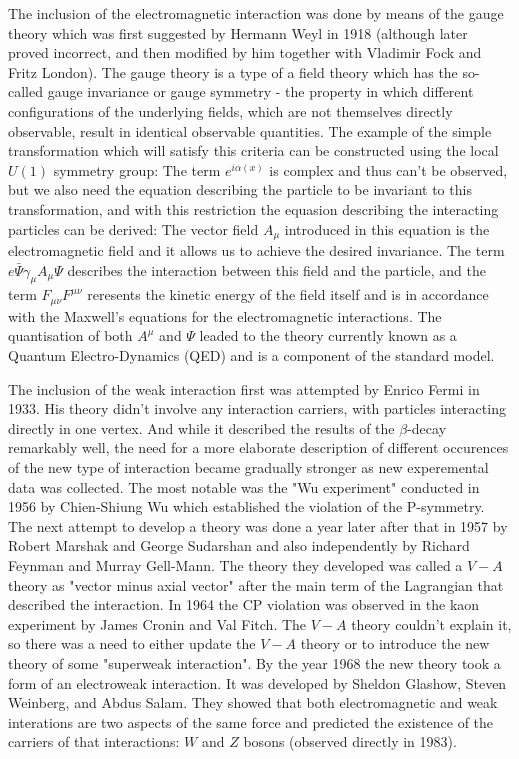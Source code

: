 The inclusion of the electromagnetic interaction was done by means of the gauge theory which was first suggested by Hermann Weyl in 1918 (although later proved incorrect, and then modified by him together with Vladimir Fock and Fritz London). The gauge theory is a type of a field theory which has the so-called gauge invariance or gauge symmetry - the property in which different configurations of the underlying fields, which are not themselves directly observable, result in identical observable quantities. The example of the simple transformation which will satisfy this criteria can be constructed using the local $U(1)$ symmetry group:
The term $e^{i\alpha(x)}$ is complex and thus can't be observed, but we also need the equation describing the particle to be invariant to this transformation, and with this restriction the equasion describing the interacting particles can be derived:
The vector field $A_{\mu}$ introduced in this equation is the electromagnetic field and it allows us to achieve the desired invariance. The term $e \bar \Psi \gamma_{\mu} A_{\mu} \Psi$ describes the interaction between this field and the particle, and the term $F_{\mu\nu}F^{\mu\nu}$ reresents the kinetic energy of the field itself and is in accordance with the Maxwell's equations for the electromagnetic interactions. The quantisation of both $A^{\mu}$ and $\Psi$ leaded to the theory currently known as a Quantum Electro-Dynamics (QED) and is a component of the standard model.

The inclusion of the weak interaction first was attempted by Enrico Fermi in 1933. His theory didn't involve any interaction carriers, with particles interacting directly in one vertex. And while it described the results of the $\beta$-decay remarkably well, the need for a more elaborate description of different occurences of the new type of interaction became gradually stronger as new experemental data was collected. The most notable was the "Wu experiment" conducted in 1956 by Chien-Shiung Wu which established the violation of the P-symmetry. The next attempt to develop a theory was done a year later after that in 1957 by Robert Marshak and George Sudarshan and also independently by Richard Feynman and Murray Gell-Mann. The theory they developed was called a $V-A$ theory as "vector minus axial vector" after the main term of the Lagrangian that described the interaction. In 1964 the CP violation was observed in the kaon experiment by James Cronin and Val Fitch. The $V-A$ theory couldn't explain it, so there was a need to either update the $V-A$ theory or to introduce the new theory of some "superweak interaction". By the year 1968 the new theory took a form of an electroweak interaction. It was developed by Sheldon Glashow, Steven Weinberg, and Abdus Salam. They showed that both electromagnetic and weak interations are two aspects of the same force and predicted the existence of the carriers of that interactions: $W$ and $Z$ bosons (observed directly in 1983).

